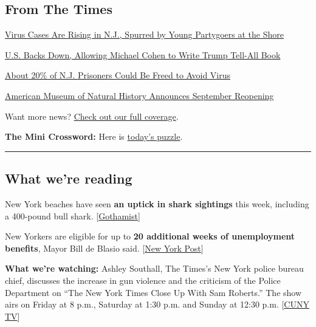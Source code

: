 \hypertarget{from-the-times}{%
\subsection{From The Times}\label{from-the-times}}

\href{https://www.nytimes.com/2020/07/30/nyregion/coronavirus-cases-nj.html}{Virus
Cases Are Rising in N.J., Spurred by Young Partygoers at the Shore}

\href{https://www.nytimes.com/2020/07/30/nyregion/michael-cohen-donald-trump-book.html}{U.S.
Backs Down, Allowing Michael Cohen to Write Trump Tell-All Book}

\href{https://www.nytimes.com/2020/07/30/nyregion/New-jersey-inmate-release-Covid.html}{About
20\% of N.J. Prisoners Could Be Freed to Avoid Virus}

\href{https://www.nytimes.com/2020/07/30/arts/design/american-museum-of-natural-history-reopen-covid.html}{American
Museum of Natural History Announces September Reopening}

Want more news? \href{https://www.nytimes.com/section/nyregion}{Check
out our full coverage}.

\textbf{The Mini Crossword:} Here is
\href{https://www.nytimes.com/crosswords/game/mini}{today's puzzle}.

\begin{center}\rule{0.5\linewidth}{\linethickness}\end{center}

\hypertarget{what-were-reading}{%
\subsection{What we're reading}\label{what-were-reading}}

New York beaches have seen \textbf{an uptick in shark sightings} this
week, including a 400-pound bull shark.
{[}\href{https://gothamist.com/news/400-pound-shark-caught-long-island-amid-uptick-shark-sightings-ny-beaches}{Gothamist}{]}

New Yorkers are eligible for up to \textbf{20 additional weeks of
unemployment benefits}, Mayor Bill de Blasio said.
{[}\href{https://nypost.com/2020/07/30/new-yorkers-eligible-for-20-extra-weeks-of-unemployment-de-blasio/}{New
York Post}{]}

\textbf{What we're watching:} Ashley Southall, The Times's New York
police bureau chief, discusses the increase in gun violence and the
criticism of the Police Department on ``The New York Times Close Up With
Sam Roberts.'' The show airs on Friday at 8 p.m., Saturday at 1:30 p.m.
and Sunday at 12:30 p.m.
{[}\href{https://tv.cuny.edu/show/nytcloseup}{CUNY TV}{]}

